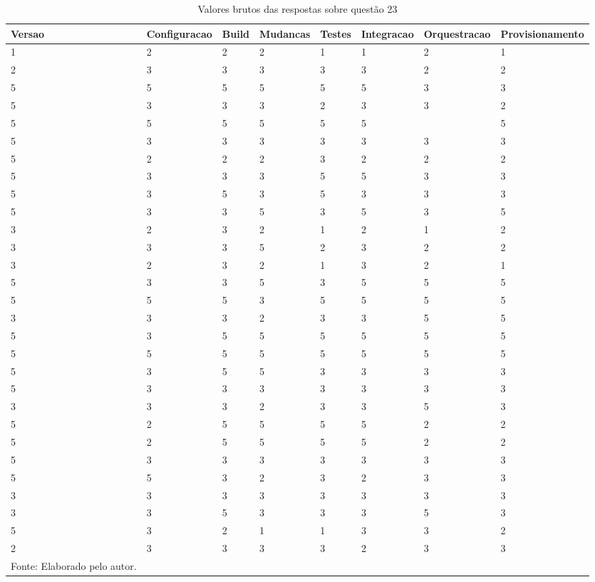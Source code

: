 \documentclass[twoside,english,brazilian]{UNISINOSartigo}
\newcommand{\source}[1]{\caption*{Fonte: {#1}} }
\begin{document}
{\footnotesize\begin{longtable}{llllllll}
\caption{Valores brutos das respostas sobre questão 23}
\hline
Versao & Configuracao & Build & Mudancas & Testes & Integracao & Orquestracao & Provisionamento \\
\hline
\endfirsthead
%
\endhead
%
1 & 2 & 2 & 2 & 1 & 1 & 2 & 1 \\
2 & 3 & 3 & 3 & 3 & 3 & 2 & 2 \\
5 & 5 & 5 & 5 & 5 & 5 & 3 & 3 \\
5 & 3 & 3 & 3 & 2 & 3 & 3 & 2 \\
5 & 5 & 5 & 5 & 5 & 5 &  & 5 \\
5 & 3 & 3 & 3 & 3 & 3 & 3 & 3 \\
5 & 2 & 2 & 2 & 3 & 2 & 2 & 2 \\
5 & 3 & 3 & 3 & 5 & 5 & 3 & 3 \\
5 & 3 & 5 & 3 & 5 & 3 & 3 & 3 \\
5 & 3 & 3 & 5 & 3 & 5 & 3 & 5 \\
3 & 2 & 3 & 2 & 1 & 2 & 1 & 2 \\
3 & 3 & 3 & 5 & 2 & 3 & 2 & 2 \\
3 & 2 & 3 & 2 & 1 & 3 & 2 & 1 \\
5 & 3 & 3 & 5 & 3 & 5 & 5 & 5 \\
5 & 5 & 5 & 3 & 5 & 5 & 5 & 5 \\
3 & 3 & 3 & 2 & 3 & 3 & 5 & 5 \\
5 & 3 & 5 & 5 & 5 & 5 & 5 & 5 \\
5 & 5 & 5 & 5 & 5 & 5 & 5 & 5 \\
5 & 3 & 5 & 5 & 3 & 3 & 3 & 3 \\
5 & 3 & 3 & 3 & 3 & 3 & 3 & 3 \\
3 & 3 & 3 & 2 & 3 & 3 & 5 & 3 \\
5 & 2 & 5 & 5 & 5 & 5 & 2 & 2 \\
5 & 2 & 5 & 5 & 5 & 5 & 2 & 2 \\
5 & 3 & 3 & 3 & 3 & 3 & 3 & 3 \\
5 & 5 & 3 & 2 & 3 & 2 & 3 & 3 \\
3 & 3 & 3 & 3 & 3 & 3 & 3 & 3 \\
3 & 3 & 5 & 3 & 3 & 3 & 5 & 3 \\
5 & 3 & 2 & 1 & 1 & 3 & 3 & 2 \\
2 & 3 & 3 & 3 & 3 & 2 & 3 & 3 \\
\hline
\source{Elaborado pelo autor.}
\end{longtable}}
\end{document}
